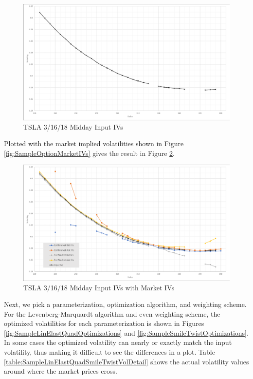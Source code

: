 \documentclass[12pt, a4paper, notitlepage]{article}
\numberwithin{equation}{subsection}
\numberwithin{figure}{subsection}
\numberwithin{table}{subsection}
\begin{document}
\begin{figure}[H]
	\caption{TSLA 3/16/18 Midday Input IVs}
	\centerline{\includegraphics[width=1\textwidth]{SampleInputIvs}}
	\label{fig:SampleInputIvs}
\end{figure}

Plotted with the market implied volatilities shown in Figure \ref{fig:SampleOptionMarketIVs} gives the result in Figure \ref{fig:SampleInputIvsWithMarketIvs}.

\begin{figure}[H]
	\caption{TSLA 3/16/18 Midday Input IVs with Market IVs}
	\centerline{\includegraphics[width=1\textwidth]{SampleInputAndMktIVs}}
	\label{fig:SampleInputIvsWithMarketIvs}
\end{figure}

Next, we pick a parameterization, optimization algorithm, and weighting scheme.  For the Levenberg-Marquardt algorithm and even weighting scheme, the optimized volatilities for each parameterization is shown in Figures \ref{fig:SampleLinElastQuadOptimizations} and \ref{fig:SampleSmileTwistOptimizations}.  In some cases the optimized volatility can nearly or exactly match the input volatility, thus making it difficult to see the differences in a plot.  Table \ref{table:SampleLinElastQuadSmileTwistVolDetail} shows the actual volatility values around where the market prices cross.
\end{document}

